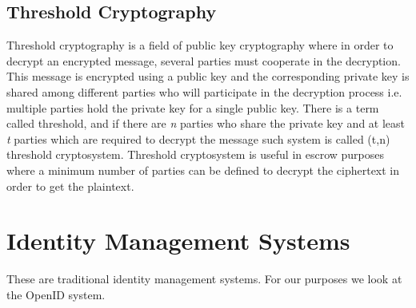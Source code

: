 \subsection{Threshold Cryptography}
Threshold cryptography is a field of public key cryptography where in order to decrypt an encrypted message, several parties must cooperate in the decryption. This message is encrypted using a public key and the corresponding private key is shared among different parties who will participate in the decryption process i.e. multiple parties hold the private key for a single public key. There is a term called threshold, and if there are \textit{n} parties who share the private key and at least \textit{t} parties which are required to decrypt the message such system is called (t,n) threshold cryptosystem. Threshold cryptosystem is useful in escrow purposes where a minimum number of parties can be defined to decrypt the ciphertext in order to get the plaintext.

\section{Identity Management Systems}
These are traditional identity management systems. For our purposes we look at the OpenID system.
